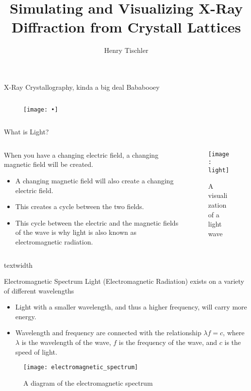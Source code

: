 \documentclass[aspectratio=169]{beamer}
\title {Simulating and Visualizing X-Ray Diffraction from Crystall Lattices}
\author{Henry Tischler}
\institute[Institute of Computing in Research]
\begin{document}
\titlepage

\begin{frame}[t]{X-Ray Crystallography, kinda a big deal}
	Bababooey
	
	\begin{columns}
		\begin{column}
			\begin{figure}
				\texttt{[image: •]}
			\end{figure}
		\end{column}
	
	\end{columns}
\end{frame}

\begin {frame}{What is Light?}
\begin{columns}
				
	\begin{column}[b]{.5\textwidth}
		When you have a changing electric field, a changing magnetic field will be created.
		\begin{itemize}
			\item A changing magnetic field will also create a changing electric field.
			\item This creates a cycle between the two fields.
			\item This cycle between the electric and the magnetic fields of the wave is why light is also known as electromagnetic radiation.
		\end{itemize}		
	\end{column}
				
	\begin{column}{.5\textwidth}
		\begin{figure}
			\texttt{[image: light]}
			\caption{A visualization of a light wave}
		\end{figure}
	\end{column}
				
\end{columns}
\end{frame}textwidth

\begin{frame}[t]{Electromagnetic Spectrum}
	Light (Electromagnetic Radiation) exists on a variety of different wavelengths
	\begin{itemize}
			\item Light with a smaller wavelength, and thus a higher frequency, will carry more energy.
		\item Wavelength and frequency are connected with the relationship $\lambda f = c$, where $\lambda$ is the wavelength of the wave, $f$ is the frequency of the wave, and $c$ is the speed of light.
	\end{itemize}
	\begin{figure}
		\texttt{[image: electromagnetic\_spectrum]}
		\caption {A diagram of the electromagnetic spectrum}
	\end{figure}
\end{frame}
\end{document}
